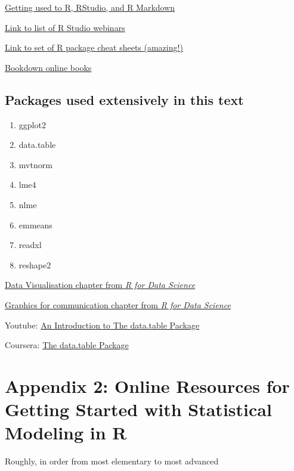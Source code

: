 \documentclass[]{book}
\providecommand{\tightlist}{%
  \setlength{\itemsep}{0pt}\setlength{\parskip}{0pt}}
\begin{document}
\href{https://bookdown.org/chesterismay/rbasics/}{Getting used to R,
RStudio, and R Markdown}

\href{https://www.rstudio.com/resources/webinars/}{Link to list of R
Studio webinars}

\href{https://www.rstudio.com/resources/cheatsheets/}{Link to set of R
package cheat sheets (amazing!)}

\href{https://bookdown.org}{Bookdown online books}

\section{Packages used extensively in this
text}\label{packages-used-extensively-in-this-text}

\begin{enumerate}
\def\labelenumi{\arabic{enumi}.}
\tightlist
\item
  ggplot2
\item
  data.table
\item
  mvtnorm
\item
  lme4
\item
  nlme
\item
  emmeans
\item
  readxl
\item
  reshape2
\end{enumerate}

\href{http://r4ds.had.co.nz/data-visualisation.html}{Data Visualisation
chapter from \emph{R for Data Science}}

\href{http://r4ds.had.co.nz/graphics-for-communication.html}{Graphics
for communication chapter from \emph{R for Data Science}}

Youtube: \href{https://www.youtube.com/watch?v=pc1ARG6kbAM}{An
Introduction to The data.table Package}

Coursera:
\href{https://www.coursera.org/learn/data-cleaning/lecture/trMZ7/the-data-table-package}{The
data.table Package}

\chapter*{Appendix 2: Online Resources for Getting Started with
Statistical Modeling in
R}\label{appendix-2-online-resources-for-getting-started-with-statistical-modeling-in-r}

Roughly, in order from most elementary to most advanced
\end{document}
